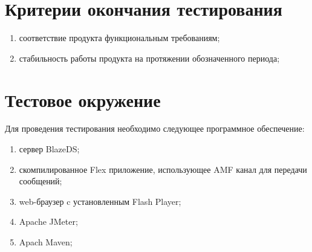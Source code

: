 \section{Критерии окончания тестирования}

\begin{enumerate}
\item соответствие продукта функциональным требованиям;
\item стабильность работы продукта на протяжении обозначенного периода;
\end{enumerate}

\section{Тестовое окружение}

Для проведения тестирования необходимо следующее программное обеспечение:

\begin{enumerate}
\item сервер BlazeDS;
\item скомпилированное Flex приложение, использующее AMF канал для передачи сообщений;
\item web-браузер c установленным Flash Player;
\item Apache JMeter;
\item Apach Maven;
\end{enumerate}
